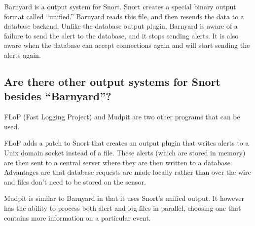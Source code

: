 \documentclass{article}
\begin{document}
Barnyard is a output system for Snort. Snort creates a special binary output
format called ``unified.'' Barnyard reads this file, and then resends the data
to a database backend. Unlike the database output plugin, Barnyard is aware of
a failure to send the alert to the database, and it stops sending alerts. It is
also aware when the database can accept connections again and will start
sending the alerts again.

\subsection{Are there other output systems for Snort besides ``Barnyard''?\label{spoolers}}

FLoP (Fast Logging Project) and Mudpit are two other programs that can be used.

FLoP adds a patch to Snort that creates an output plugin that writes alerts to
a Unix domain socket instead of a file. These alerts (which are stored in memory)
are then sent to a central server where they are then written to a database.
Advantages are that database requests are made locally rather than over
the wire and files don't need to be stored on the sensor. 


Mudpit is similar to Barnyard in that it uses Snort's unified output. It however 
has the ability to process both alert and log files in parallel, choosing one
that contains more information on a particular event.

\end{document}
